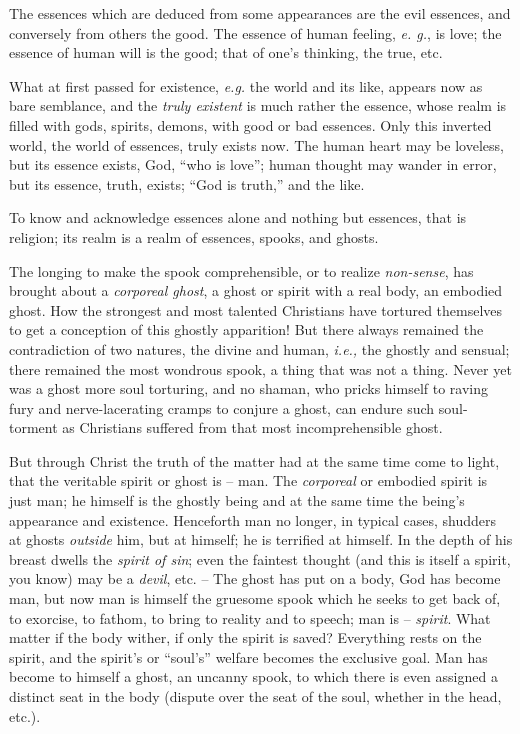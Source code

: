 \documentclass[12pt,a4paper]{book}
\begin{document}
The essences which are deduced from some appearances are the evil essences, 
and conversely from others the good. The essence of human feeling, \textit{e. 
g.}, is love; the essence of human will is the good; that of one's thinking, 
the true, etc.

What at first passed for existence, \textit{e.g.} the world and its like, 
appears now as bare semblance, and the \textit{truly existent} is much rather 
the essence, whose realm is filled with gods, spirits, demons, with good or 
bad essences. Only this inverted world, the world of essences, truly exists 
now. The human heart may be loveless, but its essence exists, God, ``who is 
love''; human thought may wander in error, but its essence, truth, exists; 
``God is truth,'' and the like.

To know and acknowledge essences alone and nothing but essences, that is 
religion; its realm is a realm of essences, spooks, and ghosts.

The longing to make the spook comprehensible, or to realize 
\textit{non-sense}, has brought about a \textit{corporeal ghost}, a ghost or 
spirit with a real body, an embodied ghost. How the strongest and most 
talented Christians have tortured themselves to get a conception of this 
ghostly apparition! But there always remained the contradiction of two 
natures, the divine and human, \textit{i.e.,} the ghostly and sensual; there 
remained the most wondrous spook, a thing that was not a thing. Never yet was 
a ghost more soul torturing, and no shaman, who pricks himself to raving fury 
and nerve-lacerating cramps to conjure a ghost, can endure such soul-torment 
as Christians suffered from that most incomprehensible ghost.

But through Christ the truth of the matter had at the same time come to light, 
that the veritable spirit or ghost is -- man. The \textit{corporeal} or 
embodied spirit is just man; he himself is the ghostly being and at the same 
time the being's appearance and existence. Henceforth man no longer, in 
typical cases, shudders at ghosts \textit{outside} him, but at himself; he is 
terrified at himself. In the depth of his breast dwells the \textit{spirit of 
sin}; even the faintest thought (and this is itself a spirit, you know) may be 
a \textit{devil}, etc. -- The ghost has put on a body, God has become man, but 
now man is himself the gruesome spook which he seeks to get back of, to 
exorcise, to fathom, to bring to reality and to speech; man is -- 
\textit{spirit}. What matter if the body wither, if only the spirit is saved? 
Everything rests on the spirit, and the spirit's or ``soul's'' welfare 
becomes the exclusive goal. Man has become to himself a ghost, an uncanny 
spook, to which there is even assigned a distinct seat in the body (dispute 
over the seat of the soul, whether in the head, etc.).
\end{document}
